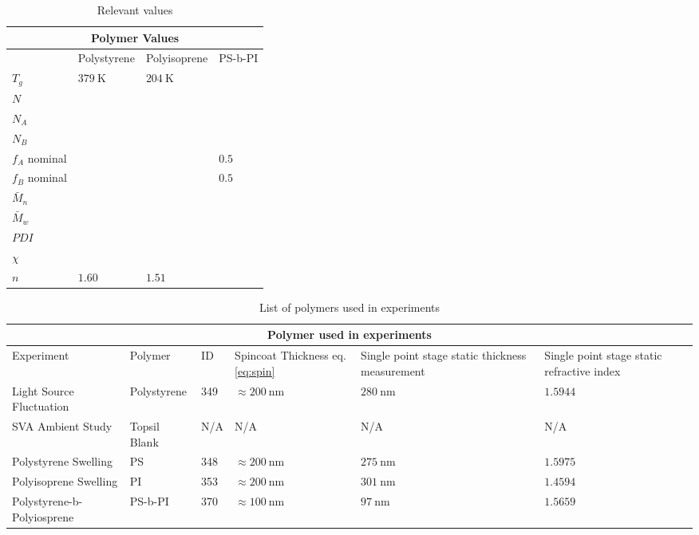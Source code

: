 \documentclass[MasterThesisMain.tex]{subfiles}
\begin{document}
\begin{table}
	\caption{Relevant values}
\begin{tabular}{ |p{3cm}||p{3cm}|p{3cm}|p{3cm}|  }
 \hline
 \multicolumn{4}{|c|}{Polymer Values} \\
 \hline
    & Polystyrene & Polyisoprene & PS-b-PI\\
 \hline
 $T_g$& $\SI{379}{\kelvin}$   & $\SI{204}{\kelvin}$  &   \\
 $N$&  &  &  \\
 $N_A$&  &  &  \\
 $N_B$&  &  &  \\
 $f_A$ nominal&  &  & $0.5$  \\
 $f_B$ nominal&  &  & $0.5$  \\
 $\bar{M}_n$&  &  &  \\
 $\bar{M}_w$&  &  &  \\
 $PDI$&  &  &  \\
 $\chi$&  &  &  \\
 $n$& $1.60$ & $1.51$ &\\
 \hline
\end{tabular}
\end{table}


\begin{table}
	\caption{List of polymers used in experiments}
\begin{tabular}{ |p{3cm}||p{2cm}|p{2cm}|p{2cm}|p{2cm}|p{2cm}|  }
 \hline
 \multicolumn{6}{|c|}{Polymer used in experiments} \\
 \hline
 Experiment & Polymer & ID & Spincoat Thickness eq.\ref{eq:spin} & Single point stage static thickness measurement & Single point stage static refractive index\\
 \hline
 Light Source Fluctuation & Polystyrene & 349 & $\approx\SI{200}{\nano\meter}$ & $\SI{280}{\nano\meter}$ & $1.5944$  \\
 SVA Ambient Study & Topsil Blank & N/A & N/A & N/A & N/A  \\
 Polystyrene Swelling & PS  & 348  & $\approx\SI{200}{\nano\meter}$ & $\SI{275}{\nano\meter}$ & $1.5975$  \\
 Polyisoprene Swelling & PI  & 353 & $\approx\SI{200}{\nano\meter}$ & $\SI{301}{\nano\meter}$ & $1.4594$  \\
 Polystyrene-b-Polyiosprene & PS-b-PI & 370 & $\approx\SI{100}{\nano\meter}$ & $\SI{97}{\nano\meter}$ & $1.5659$ \\  
\hline
\end{tabular}
\label{tab:polymers}
\end{table}
\end{document}
